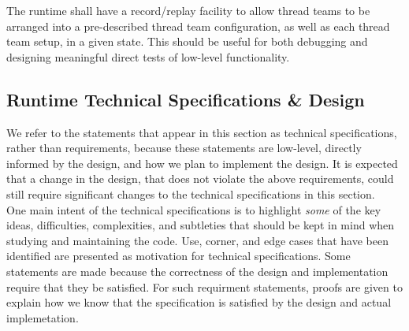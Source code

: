 \documentclass{article}
\begin{document}
\begin{req}
The runtime shall have a record/replay facility to allow thread teams to be
arranged into a pre-described thread team configuration, as well as each thread team setup, in a given
state.  This should be useful for both debugging and designing meaningful direct
tests of low-level functionality.
\end{req}

\subsection{Runtime Technical Specifications \& Design}
We refer to the statements that appear in this section as technical
specifications, rather than requirements, because these statements are low-level,
directly informed by the design, and how we plan to implement the design.
It is expected that a change in the design, that does not violate the
above requirements, could still require significant changes to the technical
specifications in this section.\\

One main intent of the technical specifications is to highlight \textit{some} of
the key ideas, difficulties, complexities, and subtleties that should be kept in
mind when studying and maintaining the code.  Use, corner, and edge cases
that have been identified are presented as motivation for technical
specifications.  Some statements are made because the correctness of
the design and implementation require that they be satisfied.  For such
requirment statements, proofs are given to explain how we know that the
specification is satisfied by the design and actual implemetation.


\end{document}
